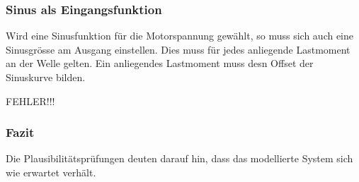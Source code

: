 \subsubsection{Sinus als Eingangsfunktion}
Wird eine Sinusfunktion für die Motorspannung gewählt, so muss sich auch
eine Sinusgrösse am Ausgang einstellen. Dies muss für jedes anliegende
Lastmoment an der Welle gelten. Ein anliegendes Lastmoment muss desn Offset
der Sinuskurve bilden.

FEHLER!!!

\subsubsection{Fazit}
Die Plausibilitätsprüfungen deuten darauf hin, dass das modellierte System
sich wie erwartet verhält.
